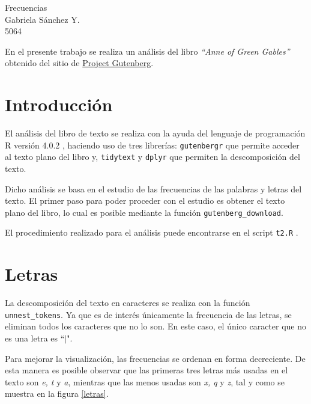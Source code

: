 \documentclass[12pt]{article}
\begin{document}
	\thispagestyle{empty}

	\begin{center}
		{\Large Frecuencias}\\ %
		Gabriela S\'anchez Y.\\
		5064
	\end{center}

	En el presente trabajo se realiza un análisis del libro \textit{``Anne of Green Gables''} obtenido del sitio de \href{http://www.gutenberg.org/}{Project Gutenberg}. 

	\section{Introducción}
	
	El análisis del libro de texto se realiza con la ayuda del lenguaje de programación \textsc{R} versión 4.0.2 \cite{r}, haciendo uso de tres librerías: \texttt{gutenbergr} que permite acceder al texto plano del libro y, \texttt{tidytext} y \texttt{dplyr} que permiten la descomposición del texto.

	Dicho análisis se basa en el estudio de las frecuencias de las palabras y letras del texto. El primer paso para poder proceder con el estudio es obtener el texto plano del libro, lo cual es posible mediante la función \texttt{gutenberg\_download}.  
	
	El procedimiento realizado para el análisis puede encontrarse en el script \texttt{t2.R} \cite{mpa_gaby}.

	\section{Letras}
	
	La descomposición del texto en caracteres se realiza con la función \texttt{unnest\_tokens}. Ya que es de interés únicamente la frecuencia de las letras, se eliminan todos los caracteres que no lo son. En este caso, el único caracter que no es una letra es ``$\mid$". 
	
	Para mejorar la visualización, las frecuencias se ordenan en forma decreciente. De esta manera es posible observar que las primeras tres letras más usadas en el texto son \textit{e, t} y \textit{a}, mientras que las menos usadas son \textit{x, q} y \textit{z}, tal y como se muestra en la figura \ref{letras}.
	
\end{document}
